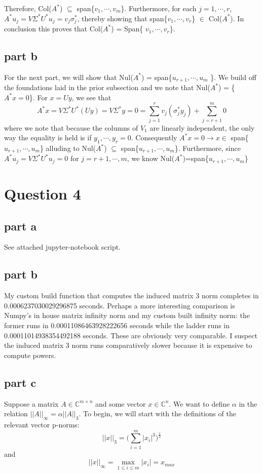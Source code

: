 \documentclass[a4paper,12pt]{article}
\begin{document}
Therefore, Col($A^*$) $\subseteq$ span\{$v_1,\cdots, v_m$\}. Furthermore, for each $j=1,\cdots, r$, $A^*u_j=V\Sigma^* U^*u_j=v_j \sigma_j^*$, thereby showing that span\{$v_1,\cdots, v_r$\} $\in$ Col($A^*$). In conclusion this proves that Col($A^*$) = Span\{ $v_1,\cdots, v_r$\}. 

\subsection{part b}
For the next part, we will show that Nul($A^*$) = span\{$u_{r+1},\cdots,u_m$ \}. We build off the foundations laid in the prior subsection and we note that Nul($A^*$) = \{ $A^*x=0$\}. For $x=Uy$,  we see that
\begin{equation}
A^*x=V\Sigma^* U^* (Uy) =V\Sigma^* y =0= \sum_{j=1}^r v_j (\sigma_j^* y_j) + \sum_{j=r+1}^m 0
\end{equation}
where we note that because the columns of $V_1$ are linearly independent, the only way the equality is held is if $y_1,\cdots, y_r =0$. Consequently $A^*x=0 \rightarrow x \in $ span\{$u_{r+1},\cdots, u_m $\} alluding to Nul($A^*$) $\subseteq$ span\{$ u_{r+1}, \cdots, u_m$\}. Furthermore, since $A^*u_j=V\Sigma^*U^*u_j=0$ for $j=r+1,\cdots,m$, we know Nul($A^*$)=span\{$u_{r+1},\cdots,u_m$\}

\section{Question 4}
\subsection{part a}
See attached jupyter-notebook script.

\subsection{part b}
My custom build function that computes the induced matrix 3 norm completes in 0.0006237030029296875 seconds. Perhaps a more interesting comparison is Numpy's in house matrix infinity norm and my custom built infinity norm: the former runs in 0.00011086463928222656 seconds while the ladder runs in  0.00011014938354492188 seconds. These are obviously very comparable. I suspect the induced matrix 3 norm runs comparatively slower because it is expensive to compute powers. 

\subsection{part c}
Suppose a matrix $A \in \mathbb{C}^{m\times n}$ and some vector $x \in \mathbb{C}^n$. We want to define $\alpha$ in the relation $||A||_{\infty}=\alpha || A||_3$. To begin, we will start with the definitions of the relevant vector p-norms:
\begin{equation}
||x||_3 = \bigg( \sum_{i=1}^m |x_i|^3   \bigg)^{\frac{1}{3}}
\end{equation}
and
\begin{equation}
||x||_{\infty}= \max_{1\leq i\leq m} |x_i| = x_{max}
\end{equation}
\end{document}
